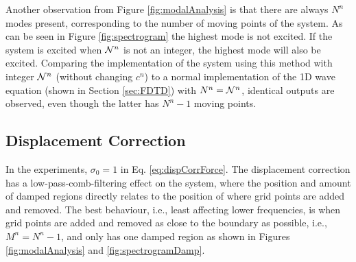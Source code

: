 Another observation from Figure \ref{fig:modalAnalysis} is that there are always $N^n$ modes present, corresponding to the number of moving points of the system. As can be seen in Figure \ref{fig:spectrogram} the highest mode is not excited. If the system is excited when $\mathcal{N}^n$ is not an integer, the highest mode will also be excited.
Comparing the implementation of the system using this method with integer $\mathcal{N}^n$ (without changing $c^n$) to a normal implementation of the 1D wave equation (shown in Section \ref{sec:FDTD}) with $N^n = \mathcal{N}^n$, identical outputs are observed, even though the latter has $N^n-1$ moving points.


\subsection{Displacement Correction}\label{sec:dispCorrRes}
In the experiments, $\sigma_0 = 1$ in Eq. \eqref{eq:dispCorrForce}. The displacement correction has a low-pass-comb-filtering effect on the system, where the position and amount of damped regions directly relates to the position of where grid points are added and removed. The best behaviour, i.e., least affecting lower frequencies, is when grid points are added and removed as close to the boundary as possible, i.e., $M^n = N^n - 1$, and only has one damped region as shown in Figures \ref{fig:modalAnalysis} and \ref{fig:spectrogramDamp}.



